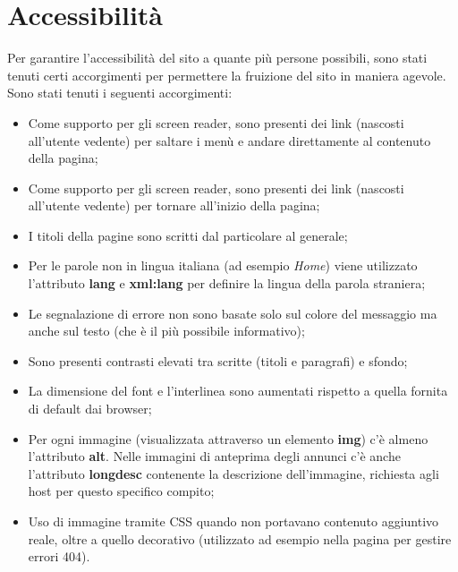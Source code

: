 \documentclass[1_relazione.tex]{subfiles}
\begin{document}
    \section{Accessibilit\`{a}}
    Per garantire l'accessibilità del sito a quante più persone possibili, sono stati tenuti certi accorgimenti per permettere la fruizione del sito in maniera agevole.
    Sono stati tenuti i seguenti accorgimenti:
    \begin{itemize}
        \item Come supporto per gli screen reader, sono presenti dei link (nascosti all'utente vedente) per saltare i men\`{u} e andare direttamente al contenuto della pagina;

        \item Come supporto per gli screen reader, sono presenti dei link (nascosti all'utente vedente) per tornare all'inizio della pagina;

        \item I titoli della pagine sono scritti dal particolare al generale;

        \item Per le parole non in lingua italiana (ad esempio \textit{Home}) viene utilizzato l'attributo \textbf{lang} e \textbf{xml:lang} per definire la lingua della parola straniera;

        \item Le segnalazione di errore non sono basate solo sul colore del messaggio ma anche sul testo (che è il più possibile informativo);

        \item Sono presenti contrasti elevati tra scritte (titoli e paragrafi) e sfondo;

        \item La dimensione del font e l'interlinea sono aumentati rispetto a quella fornita di default dai browser;

        \item Per ogni immagine (visualizzata attraverso un elemento \textbf{img}) c'è almeno l'attributo \textbf{alt}.
        Nelle immagini di anteprima degli annunci c'è anche l'attributo \textbf{longdesc} contenente la descrizione dell'immagine, richiesta agli host per questo specifico compito;

        \item Uso di immagine tramite CSS quando non portavano contenuto aggiuntivo reale, oltre a quello decorativo (utilizzato ad esempio nella pagina per gestire errori 404).

    \end{itemize}
\end{document}
